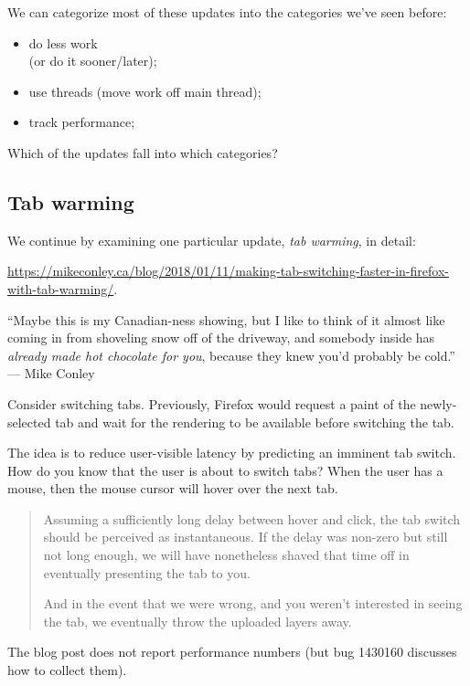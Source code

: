 \documentclass[a4paper]{report}
\begin{document}
We can categorize most of these updates into the categories we've seen before:
\begin{itemize}[noitemsep]
\item do less work\\
 (or do it sooner/later);
\item use threads (move work off main thread);
\item track performance;
\end{itemize}
Which of the updates fall into which categories?

\subsection*{Tab warming} We continue by examining one particular update, \emph{tab warming}, in detail:
\begin{center}
\scriptsize
\vspace*{-1em}
\url{https://mikeconley.ca/blog/2018/01/11/making-tab-switching-faster-in-firefox-with-tab-warming/}.
\end{center}
\vspace*{-1em}

\hfill ``Maybe this is my Canadian-ness showing, but I like to think of it almost like coming in from shoveling snow off of the driveway, and somebody inside has \emph{already made hot chocolate for you}, because they knew you’d probably be cold.'' --- Mike Conley

Consider switching tabs. Previously, Firefox would request a paint of the newly-selected tab and wait for the rendering to be available before switching the tab.

The idea is to reduce user-visible latency by predicting an imminent tab switch. How do you know that the user is about to switch tabs? When the user has a mouse, then the mouse cursor will hover over the next tab.

\begin{quote}
Assuming a sufficiently long delay between hover and click, the tab switch should be perceived as instantaneous. If the delay was non-zero but still not long enough, we will have nonetheless shaved that time off in eventually presenting the tab to you.

And in the event that we were wrong, and you weren’t interested in seeing the tab, we eventually throw the uploaded layers away.
\end{quote}

The blog post does not report performance numbers (but bug 1430160 discusses how to collect them).
\end{document}

